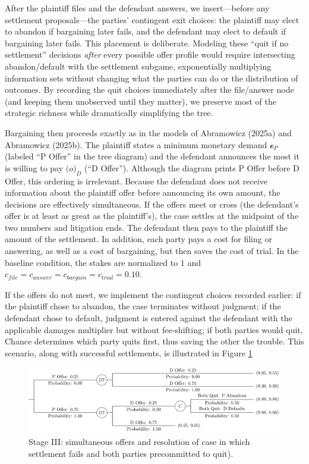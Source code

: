 \documentclass{article}
\begin{document}
After the plaintiff files and the defendant answers, we insert—before any settlement proposals—the parties’ contingent exit choices: the plaintiff may elect to abandon if bargaining later fails, and the defendant may elect to default if bargaining later fails. This placement is deliberate. Modeling these “quit if no settlement” decisions \emph{after} every possible offer profile would require intersecting abandon/default with the settlement subgame, exponentially multiplying information sets without changing what the parties can do or the distribution of outcomes. By recording the quit choices immediately after the file/answer node (and keeping them unobserved until they matter), we preserve most of the strategic richness while dramatically simplifying the tree.

Bargaining then proceeds exactly as in the models of Abramowicz (2025a) and Abramowicz (2025b). The plaintiff states a minimum monetary demand $\mathcal{o}_P$ (labeled “P Offer” in the tree diagram) and the defendant announces the most it is willing to pay $\mathcal(o)_D$ (“D Offer”). Although the diagram prints P Offer before D Offer, this ordering is irrelevant. Because the defendant does not receive information about the plaintiff offer before announcing its own amount, the decisions are effectively simultaneous. If the offers meet or cross (the defendant's offer is at least as great as the plaintiff's), the case settles at the midpoint of the two numbers and litigation ends. The defendant then pays to the plaintiff the amount of the settlement. In addition, each party pays a cost for filing or answering, as well as a cost of bargaining, but then saves the cost of trial. In the baseline condition, the stakes are normalized to $1$ and $c_{file} = c_{answer} = c_{bargain} = c_{trial} = 0.10$.

If the offers do not meet, we implement the contingent choices recorded earlier: if the plaintiff chose to abandon, the case terminates without judgment; if the defendant chose to default, judgment is entered against the defendant with the applicable damages multiplier but without fee-shifting; if both parties would quit, Chance determines which party quits first, thus saving the other the trouble. This scenario, along with successful settlements, is illustrated in Figure \ref{fig:smalltree_end.pdf}

  \begin{figure}[t]
    \centering
    \includegraphics[width=\textwidth]{../Figures/smalltree_end.pdf}
    \caption{Stage III: simultaneous offers and resolution of case in which settlement fails and both parties precommitted to quit).}
    \label{fig:smalltree_end.pdf}
  \end{figure}
\end{document}

